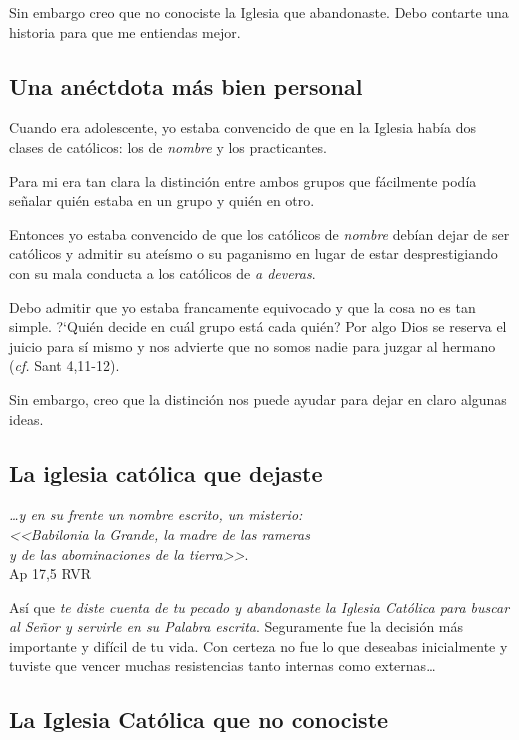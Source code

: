 \documentclass{article}
\begin{document}
Sin embargo creo que no conociste la Iglesia que abandonaste. Debo contarte una historia para que me entiendas mejor.

\subsection{Una an\'ectdota m\'as bien personal}

Cuando era adolescente, yo estaba convencido de que en la Iglesia hab\'{i}a dos clases de cat\'olicos: los de \emph{nombre} y los practicantes.

Para mi era tan clara la distinci\'on entre ambos grupos que f\'acilmente pod\'{i}a se\~nalar qui\'en estaba en un grupo y qui\'en en otro.

Entonces yo estaba convencido de que los cat\'olicos de \emph{nombre} deb\'{i}an dejar de ser cat\'olicos y admitir su ate\'{i}smo o su paganismo en lugar de estar desprestigiando con su mala conducta a los cat\'olicos de \emph{a deveras}.

Debo admitir que yo estaba francamente equivocado y que la cosa no es tan simple. ?`Qui\'en decide en cu\'al grupo est\'a cada qui\'en? Por algo Dios se reserva el juicio para s\'{i} mismo y nos advierte que no somos nadie para juzgar al hermano (\emph{cf.} Sant 4,11-12).

Sin embargo, creo que la distinci\'on nos puede ayudar para dejar en claro algunas ideas.

\subsection{La iglesia cat\'olica que dejaste}

\begin{flushright}
\emph{{\ldots}y en su frente un nombre escrito, un misterio:\\
<<Babilonia la Grande, la madre de las rameras\\
y de las abominaciones de la tierra>>}.\\
Ap 17,5 RVR
\end{flushright}

As\'{i} que \emph{te diste cuenta de tu pecado y abandonaste la Iglesia Cat\'olica para buscar al Se\~nor y servirle en su Palabra escrita}. Seguramente fue la decisi\'on m\'as importante y dif\'{i}cil de tu vida. Con certeza no fue lo que deseabas inicialmente y tuviste que vencer muchas resistencias tanto internas como externas\ldots

\subsection{La Iglesia Cat\'olica que no conociste}
\end{document}
